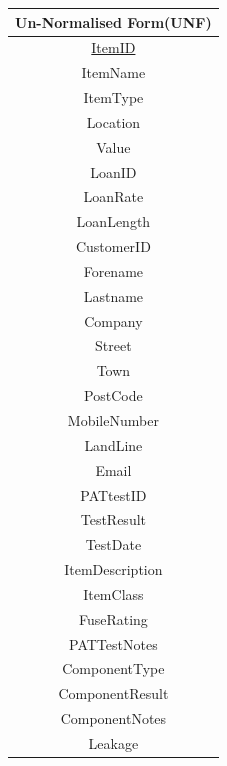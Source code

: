 \begin{center}
    \begin{tabular}{|c|}
        \hline
        \textbf{Un-Normalised Form(UNF)}\\ \hline
        \underline{ItemID}              \\
        ItemName                        \\
        ItemType                        \\
        Location                        \\ 
        Value                           \\ 
        LoanID                          \\ 
        LoanRate                        \\ 
        LoanLength                      \\ 
        CustomerID                      \\ 
        Forename                        \\ 
        Lastname                        \\ 
        Company                         \\ 
        Street                          \\ 
        Town                            \\ 
        PostCode                        \\ 
        MobileNumber                    \\ 
        LandLine                        \\ 
        Email                           \\ 
        PATtestID                       \\
        TestResult                      \\ 
        TestDate                        \\ 
        ItemDescription                 \\ 
        ItemClass                       \\ 
        FuseRating                      \\ 
        PATTestNotes                    \\ 
        ComponentType                   \\
        ComponentResult                 \\
        ComponentNotes                  \\
        Leakage                         \\ \hline
    \end{tabular}
\end{center}

